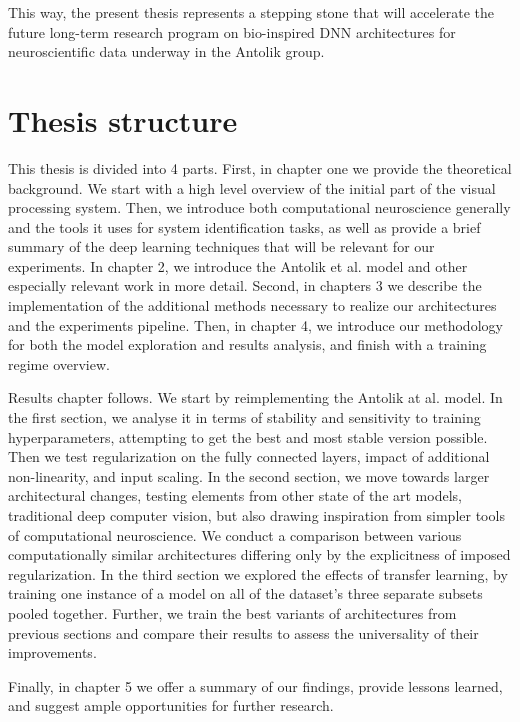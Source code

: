 This way, the present thesis represents a stepping stone that will accelerate the future long-term research program on bio-inspired DNN architectures for neuroscientific data underway in the Antolik group.

\section*{Thesis structure}
This thesis is divided into 4 parts. First, in chapter one we provide the theoretical background. We start with a high level overview of the initial part of the visual processing system. Then, we introduce both computational neuroscience generally and the tools it uses for system identification tasks, as well as provide a brief summary of the deep learning techniques that will be relevant for our experiments. In chapter 2, we introduce the Antolik et al. model and other especially relevant work in more detail. Second, in chapters 3 we describe the implementation of the additional methods necessary to realize our architectures and the experiments pipeline. Then, in chapter 4, we introduce our methodology for both the model exploration and results analysis, and finish with a training regime overview.

Results chapter follows. We start by reimplementing the Antolik at al. model. In the first section, we analyse it in terms of stability and sensitivity to training hyperparameters, attempting to get the best and most stable version possible. Then we test regularization on the fully connected layers, impact of additional non-linearity, and input scaling. In the second section, we move towards larger architectural changes, testing elements from other state of the art models, traditional deep computer vision, but also drawing inspiration from simpler tools of computational neuroscience. We conduct a comparison between various computationally similar architectures differing only by the explicitness of imposed regularization. In the third section we explored the effects of transfer learning, by training one instance of a model on all of the dataset’s three separate subsets pooled together. Further, we train the best variants of architectures from previous sections and compare their results to assess the universality of their improvements.

Finally, in chapter 5 we offer a summary of our findings, provide lessons learned, and suggest ample opportunities for further research.
